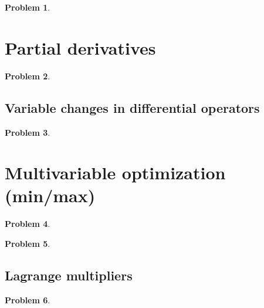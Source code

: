 \documentclass{article}
\newtheorem{problem}{Problem}
\begin{document}
\begin{problem}

\end{problem}


\section{Partial derivatives}

\begin{problem}

\end{problem}



\subsection{Variable changes in differential operators}

\begin{problem}

\end{problem}

\section{Multivariable optimization (min/max)}

\begin{problem}

\end{problem}

\begin{problem}

\end{problem}

\subsection{Lagrange multipliers}

\begin{problem}

\end{problem}
\end{document}
